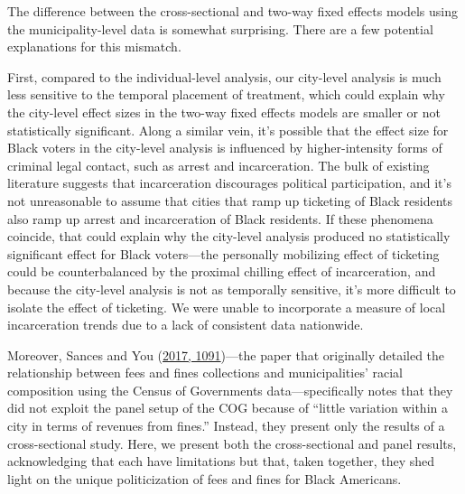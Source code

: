 \documentclass[
  12pt,
]{article}
\begin{document}
The difference between the cross-sectional and two-way fixed effects models using the municipality-level data is somewhat surprising. There are a few potential explanations for this mismatch.

First, compared to the individual-level analysis, our city-level analysis is much less sensitive to the temporal placement of treatment, which could explain why the city-level effect sizes in the two-way fixed effects models are smaller or not statistically significant. Along a similar vein, it's possible that the effect size for Black voters in the city-level analysis is influenced by higher-intensity forms of criminal legal contact, such as arrest and incarceration. The bulk of existing literature suggests that incarceration discourages political participation, and it's not unreasonable to assume that cities that ramp up ticketing of Black residents also ramp up arrest and incarceration of Black residents. If these phenomena coincide, that could explain why the city-level analysis produced no statistically significant effect for Black voters---the personally mobilizing effect of ticketing could be counterbalanced by the proximal chilling effect of incarceration, and because the city-level analysis is not as temporally sensitive, it's more difficult to isolate the effect of ticketing. We were unable to incorporate a measure of local incarceration trends due to a lack of consistent data nationwide.

Moreover, Sances and You (\protect\hyperlink{ref-Sances2017}{2017, 1091})---the paper that originally detailed the relationship between fees and fines collections and municipalities' racial composition using the Census of Governments data---specifically notes that they did not exploit the panel setup of the COG because of ``little variation within a city in terms of revenues from fines.'' Instead, they present only the results of a cross-sectional study. Here, we present both the cross-sectional and panel results, acknowledging that each have limitations but that, taken together, they shed light on the unique politicization of fees and fines for Black Americans.
\end{document}
